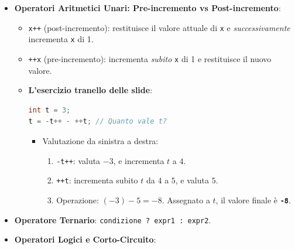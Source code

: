 \documentclass[11pt,a4paper]{article}
\newcommand{\passthrough}[1]{#1}
\providecommand{\tightlist}{\setlength{\itemsep}{0pt}\setlength{\parskip}{0pt}}
\begin{document}
\begin{itemize}
  \begin{itemize}
  \tightlist
  \item
    In Java le sotto-espressioni sono valutate \textbf{rigorosamente da
    sinistra a destra}:

    \begin{itemize}
    \tightlist
    \item
      \passthrough{\lstinline!int i = 1; int j = (i = 2) * i;!}
      \(\implies\) \passthrough{\lstinline!i!} diventa
      \passthrough{\lstinline!2!}, poi moltiplicato per
      \passthrough{\lstinline!i!} (\passthrough{\lstinline!2!})
      \(\implies\) \passthrough{\lstinline!j = 4!}.
    \item
      \passthrough{\lstinline!int t = 3; eval(t + (t = 2))!}
      \(\implies\) prima si valuta \passthrough{\lstinline!t!}
      (\passthrough{\lstinline!3!}), poi
      \passthrough{\lstinline!(t = 2)!} (\passthrough{\lstinline!2!})
      \(\implies 3 + 2 = 5\).
    \end{itemize}
  \end{itemize}
\item
  \textbf{Operatori Aritmetici Unari: Pre-incremento vs
  Post-incremento}:

  \begin{itemize}
  \item
    \passthrough{\lstinline!x++!} (post-incremento): restituisce il
    valore attuale di \passthrough{\lstinline!x!} e
    \emph{successivamente} incrementa \passthrough{\lstinline!x!} di 1.
  \item
    \passthrough{\lstinline!++x!} (pre-incremento): incrementa
    \emph{subito} \passthrough{\lstinline!x!} di 1 e restituisce il
    nuovo valore.
  \item
    \textbf{L'esercizio tranello delle slide}:

\begin{lstlisting}[language=Java]
int t = 3;
t = -t++ - ++t; // Quanto vale t?
\end{lstlisting}

    \begin{itemize}
    \tightlist
    \item
      Valutazione da sinistra a destra:

      \begin{enumerate}
      \def\labelenumi{\arabic{enumi}.}
      \tightlist
      \item
        \passthrough{\lstinline!-t++!}: valuta \(-3\), e incrementa
        \(t\) a \(4\).
      \item
        \passthrough{\lstinline!++t!}: incrementa subito \(t\) da \(4\)
        a \(5\), e valuta \(5\).
      \item
        Operazione: \((-3) - 5 = -8\). Assegnato a \(t\), il valore
        finale è \textbf{\passthrough{\lstinline!-8!}}.
      \end{enumerate}
    \end{itemize}
  \end{itemize}
\item
  \textbf{Operatore Ternario}:
  \passthrough{\lstinline!condizione ? expr1 : expr2!}.
\item
  \textbf{Operatori Logici e Corto-Circuito}:


\end{itemize}
\end{document}
